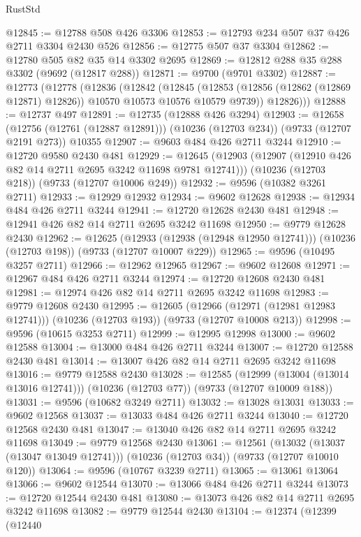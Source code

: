 \begin{lexlean}{RustStd}
\begin{coremodule}
@12845 := @12788 @508 @426 @3306
@12853 := @12793 @234 @507 @37 @426 @2711 @3304 @2430 @526
@12856 := @12775 @507 @37 @3304
@12862 := @12780 @505 @82 @35 @14 @3302 @2695
@12869 := @12812 @288 @35 @288 @3302 (@9692 (@12817 @288))
@12871 := @9700 (@9701 @3302)
@12887 := @12773
    (@12778
      (@12836
        (@12842
          (@12845
            (@12853 (@12856 (@12862 (@12869 @12871) @12826)) @10570 @10573 @10576 @10579 @9739))
          @12826)))
@12888 := @12737 @497
@12891 := @12735 (@12888 @426 @3294)
@12903 := @12658
    (@12756 (@12761 (@12887 @12891)))
    (@10236 (@12703 @234))
    (@9733 (@12707 @2191 @273))
    @10355
@12907 := @9603 @484 @426 @2711 @3244
@12910 := @12720 @9580 @2430 @481
@12929 := @12645
    (@12903 (@12907 (@12910 @426 @82 @14 @2711 @2695 @3242 @11698 @9781 @12741)))
    (@10236 (@12703 @218))
    (@9733 (@12707 @10006 @249))
@12932 := @9596 (@10382 @3261 @2711)
@12933 := @12929 @12932
@12934 := @9602 @12628
@12938 := @12934 @484 @426 @2711 @3244
@12941 := @12720 @12628 @2430 @481
@12948 := @12941 @426 @82 @14 @2711 @2695 @3242 @11698
@12950 := @9779 @12628 @2430
@12962 := @12625
    (@12933 (@12938 (@12948 @12950 @12741)))
    (@10236 (@12703 @198))
    (@9733 (@12707 @10007 @229))
@12965 := @9596 (@10495 @3257 @2711)
@12966 := @12962 @12965
@12967 := @9602 @12608
@12971 := @12967 @484 @426 @2711 @3244
@12974 := @12720 @12608 @2430 @481
@12981 := @12974 @426 @82 @14 @2711 @2695 @3242 @11698
@12983 := @9779 @12608 @2430
@12995 := @12605
    (@12966 (@12971 (@12981 @12983 @12741)))
    (@10236 (@12703 @193))
    (@9733 (@12707 @10008 @213))
@12998 := @9596 (@10615 @3253 @2711)
@12999 := @12995 @12998
@13000 := @9602 @12588
@13004 := @13000 @484 @426 @2711 @3244
@13007 := @12720 @12588 @2430 @481
@13014 := @13007 @426 @82 @14 @2711 @2695 @3242 @11698
@13016 := @9779 @12588 @2430
@13028 := @12585
    (@12999 (@13004 (@13014 @13016 @12741)))
    (@10236 (@12703 @77))
    (@9733 (@12707 @10009 @188))
@13031 := @9596 (@10682 @3249 @2711)
@13032 := @13028 @13031
@13033 := @9602 @12568
@13037 := @13033 @484 @426 @2711 @3244
@13040 := @12720 @12568 @2430 @481
@13047 := @13040 @426 @82 @14 @2711 @2695 @3242 @11698
@13049 := @9779 @12568 @2430
@13061 := @12561
    (@13032 (@13037 (@13047 @13049 @12741)))
    (@10236 (@12703 @34))
    (@9733 (@12707 @10010 @120))
@13064 := @9596 (@10767 @3239 @2711)
@13065 := @13061 @13064
@13066 := @9602 @12544
@13070 := @13066 @484 @426 @2711 @3244
@13073 := @12720 @12544 @2430 @481
@13080 := @13073 @426 @82 @14 @2711 @2695 @3242 @11698
@13082 := @9779 @12544 @2430
@13104 := @12374
    (@12399
      (@12440

\end{coremodule}
\end{lexlean}
